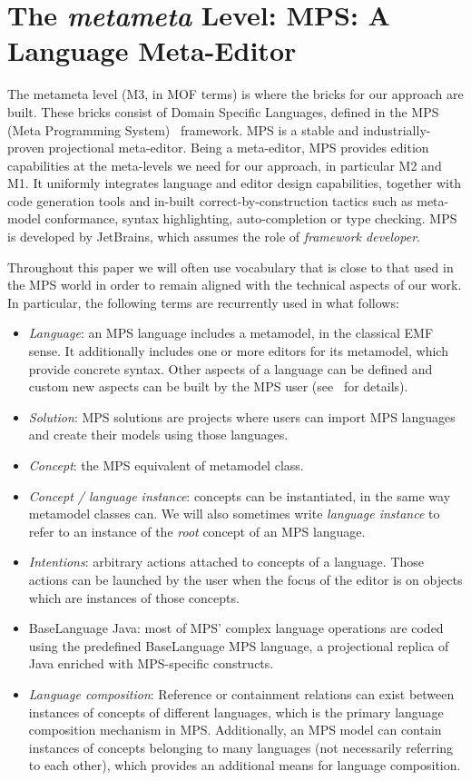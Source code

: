 \section{The \emph{metameta} Level: MPS: A Language Meta-Editor}
\label{sec:metameta}

The metameta level (M3, in MOF terms) is where the bricks for our approach are
built. These bricks consist of Domain Specific Languages, defined in the MPS
(Meta Programming System)~\cite{mps} framework. MPS is a stable and
industrially-proven projectional meta-editor. Being a meta-editor, MPS provides edition
capabilities at the meta-levels we need for our approach, in particular M2 and
M1. It uniformly integrates language and editor design capabilities, together
with code generation tools and in-built correct-by-construction tactics such as meta-model
conformance, syntax highlighting, auto-completion or type checking.  
MPS is developed by JetBrains, which assumes the role of \emph{framework
developer}. 

Throughout this paper we will often use vocabulary that is close to that used in
the MPS world in order to remain aligned with the technical aspects of our
work. In particular, the following terms are recurrently used in what follows:

\begin{itemize}
  \item \emph{Language}: an MPS language includes a metamodel, in the classical
  EMF sense. It additionally includes one or more editors for its metamodel,
  which provide concrete syntax. Other aspects of a language
  can be defined and custom new aspects can be
  built by the MPS user (see~\cite{mps} for details).
  \item \emph{Solution}: MPS solutions are projects where users can import
  MPS languages and create their models using those languages.
  \item \emph{Concept}: the MPS equivalent of metamodel class.
  \item \emph{Concept / language instance}: concepts can be instantiated, in
  the same way metamodel classes can. We will also sometimes write
  \emph{language instance} to refer to an instance of the \emph{root} concept of
  an MPS language.
  \item \emph{Intentions}: arbitrary actions attached to concepts of a
  language. Those actions can be launched by the user when the
  focus of the editor is on objects which are instances of those concepts.
  \item \textsf{BaseLanguage Java}: most of MPS' complex language operations are
  coded using the predefined \textsf{BaseLanguage} MPS language, a projectional
  replica of Java enriched with MPS-specific constructs.
  \item \emph{Language composition}:  Reference or containment relations can exist between instances of
  concepts of different languages, which is the primary language composition
  mechanism in MPS. Additionally, an MPS model can contain instances of concepts
  belonging to many languages (not necessarily referring to each other), which
  provides an additional means for language composition.
\end{itemize}

